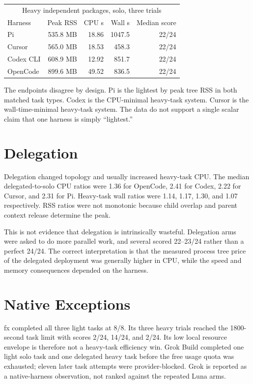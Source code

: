 \documentclass[11pt]{article}
\begin{document}
\begin{center}
\begin{tabular}{lrrrr}
\toprule
\multicolumn{5}{c}{Heavy independent packages, solo, three trials} \\
Harness & Peak RSS & CPU s & Wall s & Median score \\
\midrule
Pi & 535.8 MB & 18.86 & 1047.5 & 22/24 \\
Cursor & 565.0 MB & 18.53 & 458.3 & 22/24 \\
Codex CLI & 608.9 MB & 12.92 & 851.7 & 22/24 \\
OpenCode & 899.6 MB & 49.52 & 836.5 & 22/24 \\
\bottomrule
\end{tabular}
\end{center}

The endpoints disagree by design. Pi is the lightest by peak tree RSS in both
matched task types. Codex is the CPU-minimal heavy-task system. Cursor is the
wall-time-minimal heavy-task system. The data do not support a single scalar
claim that one harness is simply ``lightest.''

\section{Delegation}

Delegation changed topology and usually increased heavy-task CPU. The median
delegated-to-solo CPU ratios were 1.36 for OpenCode, 2.41 for Codex, 2.22 for
Cursor, and 2.31 for Pi. Heavy-task wall ratios were 1.14, 1.17, 1.30, and
1.07 respectively. RSS ratios were not monotonic because child overlap and
parent context release determine the peak.

This is not evidence that delegation is intrinsically wasteful. Delegation arms
were asked to do more parallel work, and several scored 22--23/24 rather than a
perfect 24/24. The correct interpretation is that the measured process tree
price of the delegated deployment was generally higher in CPU, while the speed
and memory consequences depended on the harness.

\section{Native Exceptions}

fx completed all three light tasks at 8/8. Its three heavy trials reached the
1800-second task limit with scores 2/24, 14/24, and 2/24. Its low local resource
envelope is therefore not a heavy-task efficiency win. Grok Build completed one
light solo task and one delegated heavy task before the free usage quota was
exhausted; eleven later task attempts were provider-blocked. Grok is reported
as a native-harness observation, not ranked against the repeated Luna arms.
\end{document}

